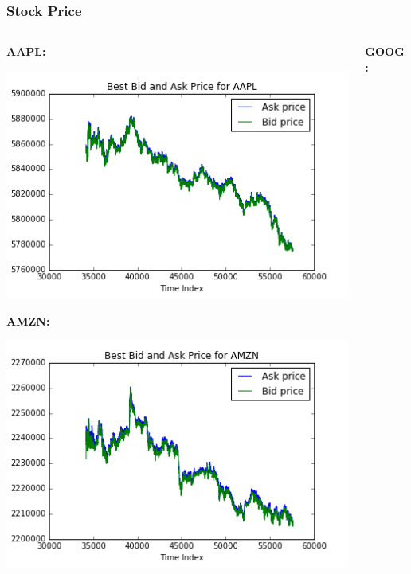 \documentclass[xcolor={x11names,svgnames,dvipsnames}]{beamer}
\begin{document}
\begin{frame}
\frametitle{Stock Price}
\begin{columns}		
		\begin{column}{.5\textwidth}
		   \textbf{AAPL:}

						\includegraphics[width=1\textwidth, height=0.4\textheight]{AAPL_price.png}

			 \textbf{AMZN:}

									\includegraphics[width=1\textwidth, height=0.4\textheight]{AMZN_price.png}

		\end{column}
		\begin{column}{.5\textwidth}
			 \textbf{GOOG:}


\end{column}
\end{columns}
\end{frame}
\end{document}
